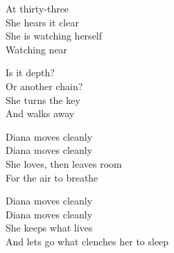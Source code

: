 \begin{lyrics}
At thirty-three\\
She hears it clear\\
She is watching herself\\
Watching near

Is it depth?\\
Or another chain?\\
She turns the key\\
And walks away

Diana moves cleanly\\
Diana moves cleanly\\
She loves, then leaves room\\
For the air to breathe

Diana moves cleanly\\
Diana moves cleanly\\
She keeps what lives\\
And lets go what clenches her to sleep
\end{lyrics}

